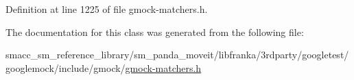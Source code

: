 Definition at line 1225 of file gmock-\/matchers.\+h.



The documentation for this class was generated from the following file\+:\begin{DoxyCompactItemize}
\item 
smacc\+\_\+sm\+\_\+reference\+\_\+library/sm\+\_\+panda\+\_\+moveit/libfranka/3rdparty/googletest/googlemock/include/gmock/\hyperlink{gmock-matchers_8h}{gmock-\/matchers.\+h}\end{DoxyCompactItemize}
